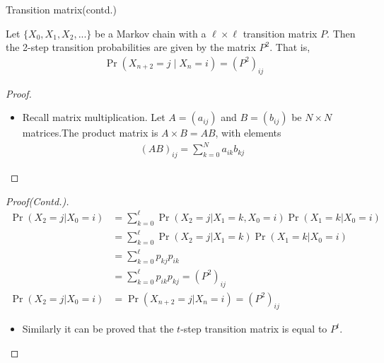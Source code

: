 \documentclass{beamer}
\providecommand{\pr}[1]{\ensuremath{\Pr\left(#1\right)}}
\begin{document}
\begin{frame}{Transition matrix(contd.)}
    \begin{theorem}
    Let $\{X_0, X_1, X_2, . . .\}$ be a Markov chain with a $\ell \times \ell $ transition matrix $P$. Then the 2-step transition probabilities are given by the matrix $P^2$. That is,
    \begin{align}
        \pr{X_{n+2}=j\mid X_{n}=i}	= (P^2)_{ij}
    \end{align}
    \end{theorem}
    \begin{proof}
    \begin{itemize}
        \item Recall matrix multiplication. Let $A = (a_{ij} )$ and $B = (b_{ij})$ be $N \times N$ matrices.The product matrix is $A \times B = AB$, with elements
        \begin{align}
            (AB)_{ij}= \sum\limits_{k=0}^N a_{ik}b_{kj}
        \end{align}
        \end{itemize}
    \end{proof}
\end{frame}
\begin{frame}{}
    \begin{proof}[Proof(Contd.)]
        \vspace{-5mm}
        \begin{align}
            \pr{X_{2}=j | X_0=i}&=\sum\limits_{k=0}^\ell \pr{X_{2}=j | X_{1}=k, X_0=i}\pr{X_{1}=k | X_0=i}\\
            &=\sum\limits_{k=0}^\ell \pr{X_{2}=j | X_{1}=k}\pr{X_{1}=k | X_0=i}\\
            &=\sum\limits_{k=0}^\ell p_{kj}p_{ik}\\
            &=\sum\limits_{k=0}^\ell p_{ik}p_{kj}       =(P^2)_{ij}\\
            \pr{X_{2}=j | X_0=i}&=\pr{X_{n+2}=j | X_n=i}=(P^2)_{ij}
        \end{align}
        \vspace{-8mm}
        \begin{itemize}
            \item Similarly it can be proved that the $t$-step transition matrix is equal to $P^t$.
        \end{itemize}
    \end{proof}
\end{frame}
\end{document}
